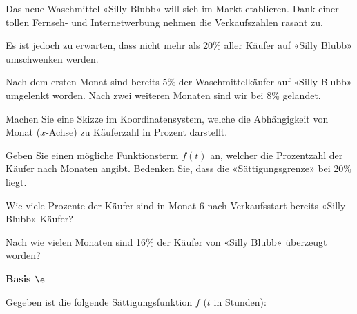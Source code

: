 Das neue Waschmittel «Silly Blubb» will sich im Markt etablieren.
Dank einer tollen Fernseh- und Internetwerbung nehmen die
Verkaufszahlen rasant zu.

Es ist jedoch zu erwarten, dass nicht mehr als 20\% aller Käufer auf
«Silly Blubb» umschwenken werden.

Nach dem ersten Monat sind bereits 5\% der Waschmittelkäufer auf
«Silly Blubb» umgelenkt worden. Nach zwei weiteren Monaten sind wir
bei 8\% gelandet.


\begin{bbwAufgabenBlock}
\item Machen Sie eine Skizze im Koordinatensystem, welche die
Abhängigkeit von Monat ($x$-Achse) zu Käuferzahl in Prozent darstellt.


\item Geben Sie einen mögliche Funktionsterm $f(t)$ an, welcher die
Prozentzahl der Käufer nach Monaten angibt. Bedenken Sie, dass die
«Sättigungsgrenze» bei 20\% liegt.


\item Wie viele Prozente der Käufer sind in Monat 6 nach Verkaufsstart
  bereits «Silly Blubb» Käufer?
  

\item Nach wie vielen Monaten sind 16\% der Käufer von «Silly Blubb»
  überzeugt worden?


\end{bbwAufgabenBlock}


\platzFuerBerechnungenBisEndeSeite{}


\bbwActAufgabenNr{} \textbf{Basis $\e$}

Gegeben ist die folgende Sättigungsfunktion $f$ ($t$ in Stunden):

